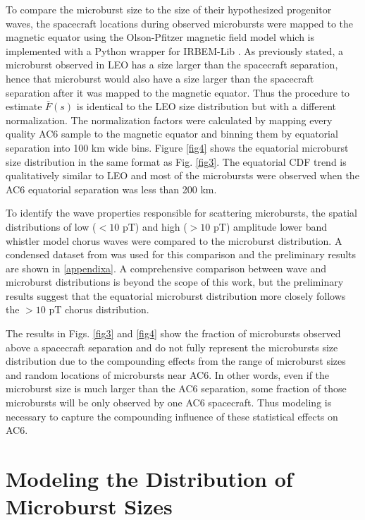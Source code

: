 \documentclass[draft]{agujournal2019}
\begin{document}
To compare the microburst size to the size of their hypothesized progenitor waves, the spacecraft locations during observed microbursts were mapped to the magnetic equator using the Olson-Pfitzer magnetic field model \cite{Olson1982} which is implemented with a Python wrapper for IRBEM-Lib \cite{irbem}. As previously stated, a microburst observed in LEO has a size larger than the spacecraft separation, hence that microburst would also have a size larger than the spacecraft separation after it was mapped to the magnetic equator. Thus the procedure to estimate $\bar{F}(s)$ is identical to the LEO size distribution but with a different normalization. The normalization factors were calculated by mapping every quality AC6 sample to the magnetic equator and binning them by equatorial separation into 100 km wide bins. Figure \ref{fig4} shows the equatorial microburst size distribution in the same format as Fig. \ref{fig3}. The equatorial CDF trend is qualitatively similar to LEO and most of the microbursts were observed when the AC6 equatorial separation was less than 200 km.

To identify the wave properties responsible for scattering microbursts, the spatial distributions of low ($< 10$ pT) and high ($> 10$ pT) amplitude lower band whistler model chorus waves were compared to the microburst distribution. A condensed dataset from  was used for this comparison and the preliminary results are shown in \ref{appendixa}. A comprehensive comparison between wave and microburst distributions is beyond the scope of this work, but the preliminary results suggest that the equatorial microburst distribution more closely follows the $> 10$ pT chorus distribution.

The results in Figs. \ref{fig3} and \ref{fig4} show the fraction of microbursts observed above a spacecraft separation and do not fully represent the microbursts size distribution due to the compounding effects from the range of microburst sizes and random locations of microbursts near AC6. In other words, even if the microburst size is much larger than the AC6 separation, some fraction of those microbursts will be only observed by one AC6 spacecraft. Thus modeling is necessary to capture the compounding influence of these statistical effects on AC6.

\section{Modeling the Distribution of Microburst Sizes} \label{model_section}
\end{document}
